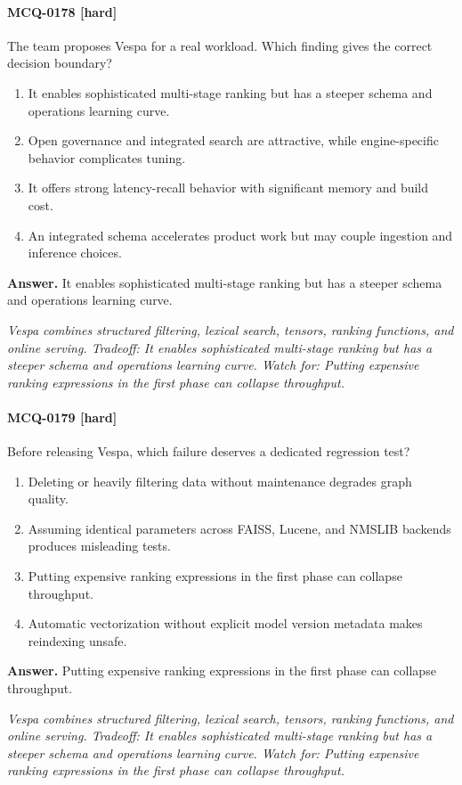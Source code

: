 \paragraph{MCQ-0178 [hard]} The team proposes Vespa for a real workload. Which finding gives the correct decision boundary?
\begin{enumerate}[label=\Alph*.]
\item It enables sophisticated multi-stage ranking but has a steeper schema and operations learning curve.
\item Open governance and integrated search are attractive, while engine-specific behavior complicates tuning.
\item It offers strong latency-recall behavior with significant memory and build cost.
\item An integrated schema accelerates product work but may couple ingestion and inference choices.
\end{enumerate}
\noindent\textbf{Answer.} It enables sophisticated multi-stage ranking but has a steeper schema and operations learning curve.
\par\textit{Vespa combines structured filtering, lexical search, tensors, ranking functions, and online serving. Tradeoff: It enables sophisticated multi-stage ranking but has a steeper schema and operations learning curve. Watch for: Putting expensive ranking expressions in the first phase can collapse throughput.}
\paragraph{MCQ-0179 [hard]} Before releasing Vespa, which failure deserves a dedicated regression test?
\begin{enumerate}[label=\Alph*.]
\item Deleting or heavily filtering data without maintenance degrades graph quality.
\item Assuming identical parameters across FAISS, Lucene, and NMSLIB backends produces misleading tests.
\item Putting expensive ranking expressions in the first phase can collapse throughput.
\item Automatic vectorization without explicit model version metadata makes reindexing unsafe.
\end{enumerate}
\noindent\textbf{Answer.} Putting expensive ranking expressions in the first phase can collapse throughput.
\par\textit{Vespa combines structured filtering, lexical search, tensors, ranking functions, and online serving. Tradeoff: It enables sophisticated multi-stage ranking but has a steeper schema and operations learning curve. Watch for: Putting expensive ranking expressions in the first phase can collapse throughput.}
